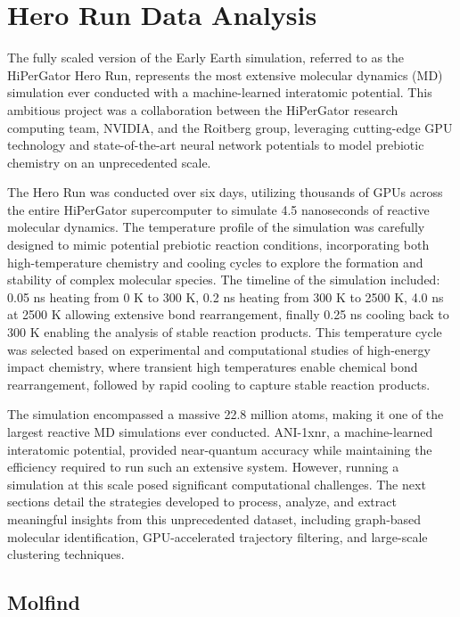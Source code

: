 \chapter{Hero Run Data Analysis} 
\label{chapter5}

The fully scaled version of the Early Earth simulation, referred to as the HiPerGator Hero Run, represents the most extensive molecular dynamics (MD) simulation ever conducted with a machine-learned interatomic potential. This ambitious project was a collaboration between the HiPerGator research computing team, NVIDIA, and the Roitberg group, leveraging cutting-edge GPU technology and state-of-the-art neural network potentials to model prebiotic chemistry on an unprecedented scale.

The Hero Run was conducted over six days, utilizing thousands of GPUs across the entire HiPerGator supercomputer to simulate 4.5 nanoseconds of reactive molecular dynamics. The temperature profile of the simulation was carefully designed to mimic potential prebiotic reaction conditions, incorporating both high-temperature chemistry and cooling cycles to explore the formation and stability of complex molecular species. The timeline of the simulation included: 0.05 ns heating from 0 K to 300 K, 0.2 ns heating from 300 K to 2500 K, 4.0 ns at 2500 K allowing extensive bond rearrangement, finally 0.25 ns cooling back to 300 K enabling the analysis of stable reaction products.
This temperature cycle was selected based on experimental and computational studies of high-energy impact chemistry, where transient high temperatures enable chemical bond rearrangement, followed by rapid cooling to capture stable reaction products.

The simulation encompassed a massive 22.8 million atoms, making it one of the largest reactive MD simulations ever conducted. ANI-1xnr, a machine-learned interatomic potential, provided near-quantum accuracy while maintaining the efficiency required to run such an extensive system. However, running a simulation at this scale posed significant computational challenges.
The next sections detail the strategies developed to process, analyze, and extract meaningful insights from this unprecedented dataset, including graph-based molecular identification, GPU-accelerated trajectory filtering, and large-scale clustering techniques.


\section{Molfind}
\label{sec:molfind}


